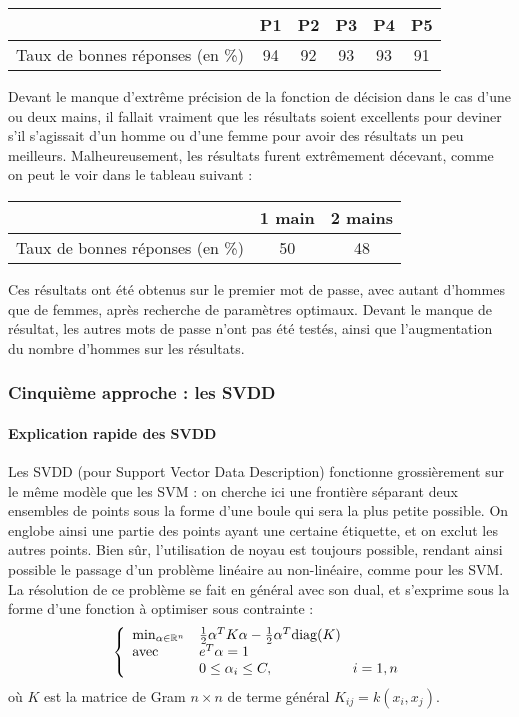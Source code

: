 \begin{center}\begin{tabular}{|c|c|c|c|c|c|}
\hline
 & P1 & P2 & P3 & P4 & P5 \\
\hline
Taux de bonnes réponses (en \%) & 94 & 92 & 93 & 93 & 91 \\
\hline
\end{tabular}\end{center}

Devant le manque d'extrême précision de la fonction de décision dans le cas d'une ou deux mains, il fallait vraiment que les résultats soient excellents pour deviner s'il s'agissait d'un homme ou d'une femme pour avoir des résultats un peu meilleurs. Malheureusement, les résultats furent extrêmement décevant, comme on peut le voir dans le tableau suivant :
\begin{center}\begin{tabular}{|c|c|c|}
\hline
 & 1 main & 2 mains \\
\hline
Taux de bonnes réponses (en \%) &  50 & 48 \\
\hline
\end{tabular}\end{center}
Ces résultats ont été obtenus sur le premier mot de passe, avec autant d'hommes que de femmes, après recherche de paramètres optimaux. Devant le manque de résultat, les autres mots de passe n'ont pas été testés, ainsi que l'augmentation du nombre d'hommes sur les résultats. 

\subsubsection{Cinquième approche : les SVDD}
\paragraph{Explication rapide des SVDD\\}
Les SVDD (pour Support Vector Data Description) fonctionne grossièrement sur le même modèle que les SVM : on cherche ici une frontière séparant deux ensembles de points sous la forme d'une boule qui sera la plus petite possible. On englobe ainsi une partie des points ayant une certaine étiquette, et on exclut les autres points. Bien sûr, l'utilisation de noyau est toujours possible, rendant ainsi possible le passage d'un problème linéaire au non-linéaire, comme pour les SVM.\\
La résolution de ce problème se fait en général avec son dual, et s'exprime sous la forme d'une fonction à optimiser sous contrainte :
\[\left\{\begin{array}{l l}
\min_{\alpha\in\mathbb{R}^n} & \frac{1}{2} \alpha^TK\alpha -\frac{1}{2}\alpha^T \text{diag}(K)\\
\text{avec } & e^T\alpha=1\\
& 0\leq \alpha_i\leq C, \hspace{2cm} i=1,n
\end{array}\right.\]
où $K$ est la matrice de Gram $n\times n$ de terme général $K_{ij}=k(x_i,x_j)$.\\

